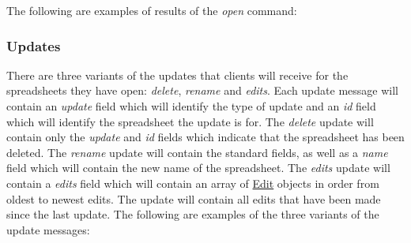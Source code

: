 The following are examples of results of the \emph{open} command:




\subsubsection{Updates}
\label{sec:message:updates}
There are three variants of the updates that clients will receive for the spreadsheets they have open: \emph{delete}, \emph{rename} and \emph{edits}.
Each update message will contain an \emph{update} field which will identify the type of update and an \emph{id} field which will identify the spreadsheet
the update is for. The \emph{delete} update will contain only the \emph{update} and \emph{id} fields which indicate that the spreadsheet has been deleted.
The \emph{rename} update will contain the standard fields, as well as a \emph{name} field which will contain the new name of the spreadsheet. The \emph{edits}
update will contain a \emph{edits} field which will contain an array of \hyperref[sec:message:edits]{Edit} objects in order from oldest to newest edits.
The update will contain all edits that have been made since the last update.
The following are examples of the three variants of the update messages:



